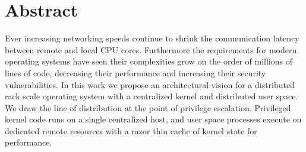 \section{Abstract}
\label{sec:abstract}

Ever increasing networking speeds continue to shrink the communication
latency between remote and local CPU cores. Furthermore the
requirements for modern operating systems have seen their complexities
grow on the order of millions of lines of code, decreasing their
performance and increasing their security vulnerabilities.  In this work
we propose an architectural vision for a distributed rack scale
operating system with a centralized kernel and distributed user space.
We draw the line of distribution at the point of privilege escalation.
Privileged kernel code runs on a single centralized host, and user
space processes execute on dedicated remote resources with a razor thin
cache of kernel state for performance.
